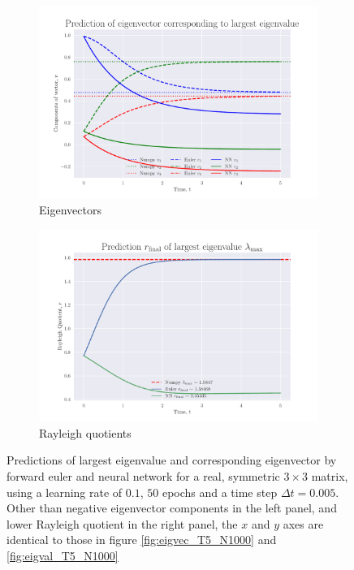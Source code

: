 \documentclass[12pt]{extarticle}
\begin{document}
\begin{figure}[h]
	
	\centering
	\begin{subfigure}{0.49\textwidth}
		\centering
		\includegraphics[width=\textwidth]{../output/plots/eigvec_T5_N1000_epochs50.pdf}
		\caption{Eigenvectors}
		\label{fig:eigvec_T5_N1000_epochs50}
	\end{subfigure}
	\hfill
	\begin{subfigure}{0.49\textwidth}
		\centering
		\includegraphics[width=\textwidth]{../output/plots/eigval_T5_N1000_epochs50.pdf}
		\caption{Rayleigh quotients}
		\label{fig:eigval_T5_N1000_epochs50}
	\end{subfigure}
	\caption{Predictions of largest eigenvalue and corresponding eigenvector by forward euler and neural network for a real, symmetric $3\times 3$ matrix, using a learning rate of $0.1$, $50$ epochs and a time step $\Delta t = 0.005$. Other than negative eigenvector components in the left panel, and lower Rayleigh quotient in the right panel, the $x$ and $y$ axes are identical to those in figure \ref{fig:eigvec_T5_N1000} and \ref{fig:eigval_T5_N1000}}
	\label{fig:eig_T5_N1000_epochs50}
\end{figure}
\end{document}
